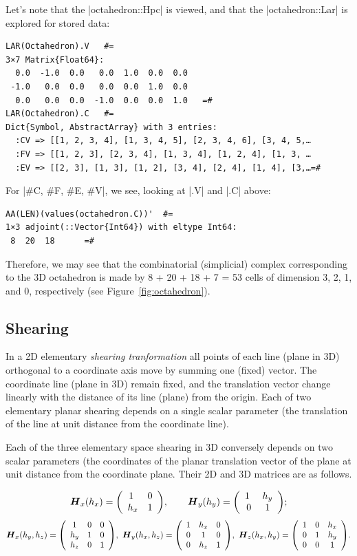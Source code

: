 \begin{coding}
\begin{coding}
Let’s note that the |octahedron::Hpc| is viewed, and that the |octahedron::Lar| is explored for stored data:\\
\begin{lstlisting}[language=JuliaLocal, style=julia, mathescape=false]
LAR(Octahedron).V 	#=
3×7 Matrix{Float64}:
  0.0  -1.0  0.0   0.0  1.0  0.0  0.0
 -1.0   0.0  0.0   0.0  0.0  1.0  0.0
  0.0   0.0  0.0  -1.0  0.0  0.0  1.0 	=#
LAR(Octahedron).C	#=
Dict{Symbol, AbstractArray} with 3 entries:
  :CV => [[1, 2, 3, 4], [1, 3, 4, 5], [2, 3, 4, 6], [3, 4, 5,…
  :FV => [[1, 2, 3], [2, 3, 4], [1, 3, 4], [1, 2, 4], [1, 3, …
  :EV => [[2, 3], [1, 3], [1, 2], [3, 4], [2, 4], [1, 4], [3,…=#
\end{lstlisting}

For |$\#$C, $\#$F, $\#$E, $\#$V|, we see, looking at |.V| and |.C| above:
\begin{lstlisting}[language=JuliaLocal, style=julia, mathescape=false]
AA(LEN)(values(octahedron.C))'	#=
1×3 adjoint(::Vector{Int64}) with eltype Int64:
 8  20  18		=#
\end{lstlisting}
Therefore, we may see that the combinatorial (simplicial) complex corresponding to the 3D octahedron is made by 
8 + 20 + 18 + 7 = 53 cells of dimension 3, 2, 1, and 0, respectively (see Figure~\ref{fig:octahedron}).
\end{coding}




\subsection*{Shearing}
\label{s*ec:ccccccc}

In  a 2D elementary \emph{shearing tranformation} all points of each line (plane in 3D) orthogonal to a coordinate axis move by summing one (fixed) vector. The coordinate line (plane in 3D) remain fixed, and the translation vector change linearly with the distance of its line (plane) from the origin. Each of two elementary planar shearing depends on a single scalar parameter (the translation of the line at unit distance from the coordinate line). 

Each of the three elementary space shearing in 3D conversely depends on two scalar parameters (the coordinates of the planar translation vector of the plane at unit distance from the coordinate plane. Their 2D  and 3D matrices are as follows.

\[
{\mbox{\boldmath $H$}}_x(h_x) = {\left(\begin{array}{cccccccc}1\  & 0\\h_x & 1 \end{array}\right)},\qquad
{\mbox{\boldmath $H$}}_y(h_y) = {\left(\begin{array}{cccccccc}1\  & h_y\\0 & 1 \end{array}\right)};
\]
\[
\T{H}_x(h_y,h_z) = \mat{1 & 0 &  0 \\h_y & 1 & 0\\h_z & 0 & 1},\ 
\T{H}_y(h_x,h_z) = \mat{1 & h_x & 0 \\0 & 1 & 0\\0 & h_z & 1},\ 
\T{H}_z(h_x,h_y) = \mat{1 &  0 &  h_x\\0 & 1 & h_y\\0 & 0 & 1}.
\]


\end{coding}
